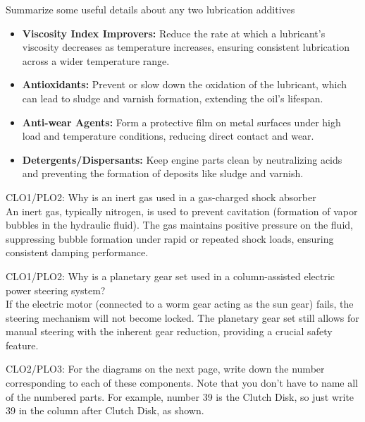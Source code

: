 \documentclass[12pt]{exam}
\begin{document}
        \begin{questions}
		

    
        \question[6] Summarize some useful details about any two lubrication additives
        \begin{itemize}
            \item \textbf{Viscosity Index Improvers:} Reduce the rate at which a lubricant's viscosity decreases as temperature increases, ensuring consistent lubrication across a wider temperature range.
            \item \textbf{Antioxidants:} Prevent or slow down the oxidation of the lubricant, which can lead to sludge and varnish formation, extending the oil's lifespan.
            \item \textbf{Anti-wear Agents:} Form a protective film on metal surfaces under high load and temperature conditions, reducing direct contact and wear.
            \item \textbf{Detergents/Dispersants:} Keep engine parts clean by neutralizing acids and preventing the formation of deposits like sludge and varnish.
        \end{itemize}
        \question[4] CLO1/PLO2: Why is an inert gas used in a gas-charged shock absorber \\
        An inert gas, typically nitrogen, is used to prevent cavitation (formation of vapor bubbles in the hydraulic fluid). The gas maintains positive pressure on the fluid, suppressing bubble formation under rapid or repeated shock loads, ensuring consistent damping performance.
                
        \question[4] CLO1/PLO2: Why is a planetary gear set used in a column-assisted electric power steering system? \\
        If the electric motor (connected to a worm gear acting as the sun gear) fails, the steering mechanism will not become locked. The planetary gear set still allows for manual steering with the inherent gear reduction, providing a crucial safety feature.
            

  
		

			
	
        
            \question[36] CLO2/PLO3: For the diagrams on the next page, write down the number corresponding to each of these components. Note that you don't have to name all of the numbered parts. For example, number 39 is the Clutch Disk, so just write 39 in the column after Clutch Disk, as shown.
    \end{questions}
\end{document}

